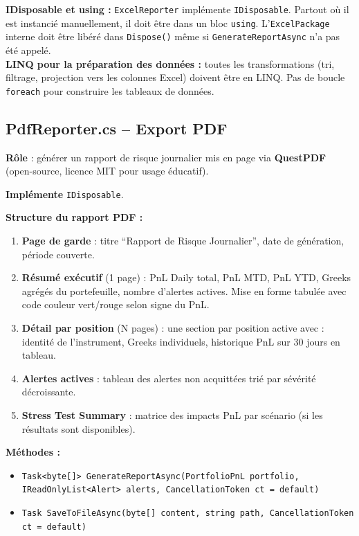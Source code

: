 \documentclass[a4paper,11pt]{article}
\newcommand{\cs}[1]{\texttt{\color{codeinline}#1}}
\begin{document}
\begin{tcolorbox}[constraint]
\textbf{IDisposable et using :} \cs{ExcelReporter} implémente
\cs{IDisposable}. Partout où il est instancié manuellement, il doit
être dans un bloc \cs{using}. L'\cs{ExcelPackage} interne doit être
libéré dans \cs{Dispose()} même si \cs{GenerateReportAsync}
n'a pas été appelé. \\[4pt]
\textbf{LINQ pour la préparation des données :} toutes les
transformations (tri, filtrage, projection vers les colonnes Excel) doivent
être en LINQ. Pas de boucle \cs{foreach} pour construire les tableaux de
données.
\end{tcolorbox}

\subsection{PdfReporter.cs -- Export PDF}

\textbf{Rôle} : générer un rapport de risque journalier mis en page
via \textbf{QuestPDF} (open-source, licence MIT pour usage éducatif).

\textbf{Implémente} \cs{IDisposable}.

\textbf{Structure du rapport PDF :}
\begin{enumerate}
  \item \textbf{Page de garde} : titre ``Rapport de
        Risque Journalier'', date de génération, période couverte.
  \item \textbf{Résumé exécutif} (1 page) : PnL Daily total,
        PnL MTD, PnL YTD, Greeks agrégés du portefeuille, nombre
        d'alertes actives. Mise en forme tabulée avec code couleur
        vert/rouge selon signe du PnL.
  \item \textbf{Détail par position} (N pages) : une section par position
        active avec : identité de l'instrument, Greeks individuels, historique
        PnL sur 30 jours en tableau.
  \item \textbf{Alertes actives} : tableau des alertes non acquittées trié
        par sévérité décroissante.
  \item \textbf{Stress Test Summary} : matrice des impacts PnL par scénario
        (si les résultats sont disponibles).
\end{enumerate}

\textbf{Méthodes :}
\begin{itemize}
  \item \cs{Task<byte[]> GenerateReportAsync(PortfolioPnL portfolio, IReadOnlyList<Alert> alerts, CancellationToken ct = default)}
  \item \cs{Task SaveToFileAsync(byte[] content, string path, CancellationToken ct = default)}
\end{itemize}
\end{document}
